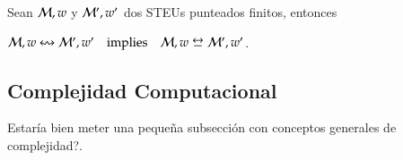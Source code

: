 \begin{teorema}
    Sean $\mathcal{M},w$ y $\mathcal{M}',w'$ dos STEUs punteados finitos, entonces
    \begin{center}
        $\model,w \modequiv \model', w' \quad\text{implies}\quad \model,w \bisim \model', w'$.
    \end{center}
\end{teorema}

\subsection[short]{Complejidad Computacional}
Estaría bien meter una pequeña subsección con conceptos generales de complejidad?.